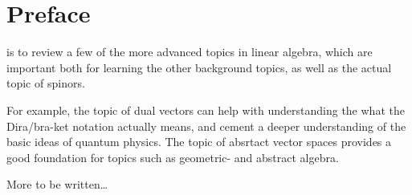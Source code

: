 \section{Preface}
 is to review a few of the more advanced topics in linear algebra, which are important both for learning the other background topics, as well as the actual topic of spinors.

For example, the topic of dual vectors can help with understanding the what the Dira/bra-ket notation actually means, and cement a deeper understanding of the basic ideas of quantum physics. The topic of absrtact vector spaces provides a good foundation for topics such as geometric- and abstract algebra.

More to be written\ldots
